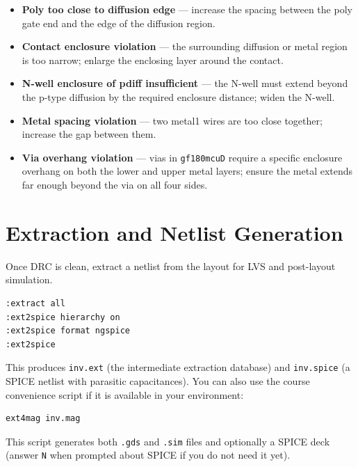 \documentclass[11pt]{article}
\begin{document}
\begin{itemize}[leftmargin=2em]
  \item \textbf{Poly too close to diffusion edge} --- increase the
        spacing between the poly gate end and the edge of the diffusion
        region.
  \item \textbf{Contact enclosure violation} --- the surrounding
        diffusion or metal region is too narrow; enlarge the enclosing
        layer around the contact.
  \item \textbf{N-well enclosure of pdiff insufficient} --- the N-well
        must extend beyond the p-type diffusion by the required
        enclosure distance; widen the N-well.
  \item \textbf{Metal spacing violation} --- two metal1 wires are too
        close together; increase the gap between them.
  \item \textbf{Via overhang violation} --- vias in \texttt{gf180mcuD}
        require a specific enclosure overhang on both the lower and
        upper metal layers; ensure the metal extends far enough beyond
        the via on all four sides.
\end{itemize}

\section{Extraction and Netlist Generation}

Once DRC is clean, extract a netlist from the layout for LVS and
post-layout simulation.

\begin{lstlisting}
:extract all
:ext2spice hierarchy on
:ext2spice format ngspice
:ext2spice
\end{lstlisting}

This produces \texttt{inv.ext} (the intermediate extraction database)
and \texttt{inv.spice} (a SPICE netlist with parasitic capacitances).
You can also use the course convenience script if it is available in
your environment:

\begin{lstlisting}
ext4mag inv.mag
\end{lstlisting}

This script generates both \texttt{.gds} and \texttt{.sim} files and
optionally a SPICE deck (answer \texttt{N} when prompted about SPICE if
you do not need it yet).
\end{document}
